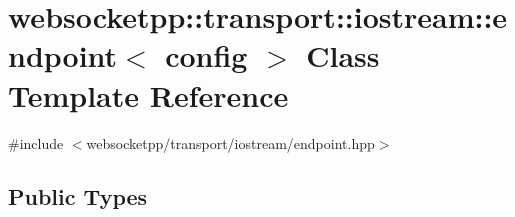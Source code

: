 \hypertarget{classwebsocketpp_1_1transport_1_1iostream_1_1endpoint}{}\section{websocketpp\+:\+:transport\+:\+:iostream\+:\+:endpoint$<$ config $>$ Class Template Reference}
\label{classwebsocketpp_1_1transport_1_1iostream_1_1endpoint}


{\ttfamily \#include $<$websocketpp/transport/iostream/endpoint.\+hpp$>$}

\subsection*{Public Types}
